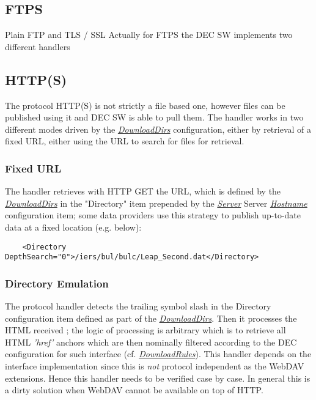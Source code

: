 \documentclass[dec_sum_main.tex]{subfiles}
\begin{document}
\subsection{FTPS}
Plain FTP and TLS / SSL Actually for FTPS the DEC SW implements two different handlers

\subsection{HTTP(S)}
The protocol HTTP(S) is not strictly a file based one, however files can be published using it and DEC SW is able to pull them. The handler works in two different modes driven by the \hyperref[DownloadDirs]{\textit{DownloadDirs}} configuration, either by retrieval of a fixed URL, either using the URL to search for files for retrieval.

\subsubsection{Fixed URL}
The handler retrieves with HTTP GET the URL, which is defined by the \hyperref[DownloadDirs]{\textit{DownloadDirs}} in the "Directory" item prepended by the \hyperref[Config_Server]{\textit{Server}} Server \hyperref[Hostname]{\textit{Hostname}} configuration item; some data providers use this strategy to publish up-to-date data at a fixed location (e.g. below):

\begin{Verbatim}
	<Directory DepthSearch="0">/iers/bul/bulc/Leap_Second.dat</Directory>
\end{Verbatim}

\subsubsection{Directory Emulation}
The protocol handler detects the trailing symbol slash in the Directory configuration item defined as part of the \hyperref[DownloadDirs]{\textit{DownloadDirs}}. Then it processes the HTML received ; the logic of processing is arbitrary which is to retrieve all HTML \textit{'href'} anchors which are then nominally filtered according to the DEC configuration for such interface (cf. \hyperref[DownloadRules]{\textit{DownloadRules}}).
This handler depends on the interface implementation since this is \textit{not} protocol independent as the WebDAV extensions. Hence this handler needs to be verified case by case. In general this is a dirty solution when WebDAV cannot be available on top of HTTP.
\end{document}
